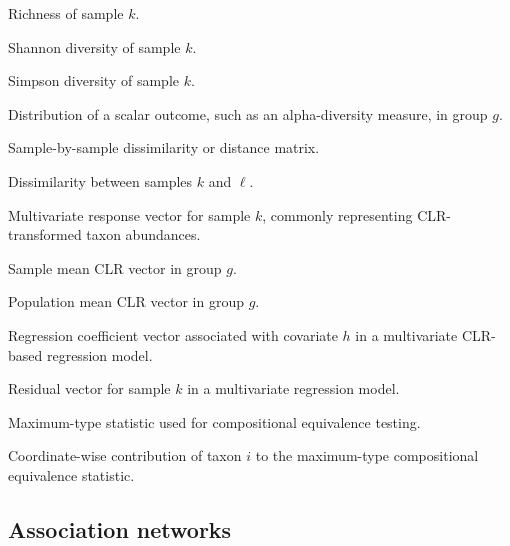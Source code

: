 \notationsettings{1.8cm}
\begin{notationlist}
	\item[$\alpha_{\mathrm{rich},k}$] Richness of sample $k$.
	
	\item[$\alpha_{\mathrm{Sh},k}$] Shannon diversity of sample $k$.
	
	\item[$\alpha_{\mathrm{Si},k}$] Simpson diversity of sample $k$.
	
	\item[$F_g$] Distribution of a scalar outcome, such as an alpha-diversity measure, in group $g$.
	
	\item[$\mathbf{D} = (d_{k\ell})$] Sample-by-sample dissimilarity or distance matrix.
	
	\item[$d_{k\ell}$] Dissimilarity between samples $k$ and $\ell$.
	
	\item[$\mathbf{y}_k$] Multivariate response vector for sample $k$, commonly representing CLR-transformed taxon abundances.
	
	\item[$\bar{\mathbf{y}}^{(g)}$] Sample mean CLR vector in group $g$.
	
	\item[$\boldsymbol{\mu}_g$] Population mean CLR vector in group $g$.
	
	\item[$\boldsymbol{\beta}_h$] Regression coefficient vector associated with covariate $h$ in a multivariate CLR-based regression model.
	
	\item[$\boldsymbol{\varepsilon}_k$] Residual vector for sample $k$ in a multivariate regression model.
	
	\item[$M_n$] Maximum-type statistic used for compositional equivalence testing.
	
	\item[$m_i$] Coordinate-wise contribution of taxon $i$ to the maximum-type compositional equivalence statistic.
\end{notationlist}

\subsection*{Association networks}


